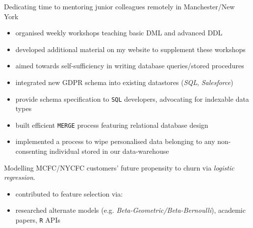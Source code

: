 \documentclass[letterpaper,11pt]{article}
\begin{document}
\begin{description}[style=multiline,leftmargin=3cm]
\begin{description}[style=multiline,leftmargin=2.5cm]
		      \item[Mentoring]
		            Dedicating time to mentoring junior colleagues remotely in Manchester/New York
		            \begin{itemize}
			            \item organised weekly workshops teaching basic DML and advanced DDL
			            \item developed additional material on my website to supplement these workshops
			            \item aimed towards self-sufficiency in writing database queries/stored procedures
		            \end{itemize}

	      \end{description}
	\item[GDPR Pipeline \textnormal{Technical Lead}]
	      \begin{itemize}
		      \item integrated new GDPR schema into existing datastores (\textit{SQL}, \textit{Salesforce})
		      \item provide schema specification to \texttt{SQL} developers, advocating for indexable data types
		      \item built efficient \texttt{MERGE} process featuring relational database design
		      \item implemented a process to wipe personalised data belonging to any non-consenting individual stored in our data-warehouse
	      \end{itemize}
	\item[Customer Churn Model]
	      Modelling MCFC/NYCFC customers' future propensity to churn via \textit{logistic regression}.
	      \begin{itemize}
		      \item contributed to feature selection via:
		      \item researched alternate models (e.g. \textit{Beta-Geometric/Beta-Bernoulli}), academic papers, \texttt{R} APIs
	      \end{itemize}
\end{description}
\end{document}

